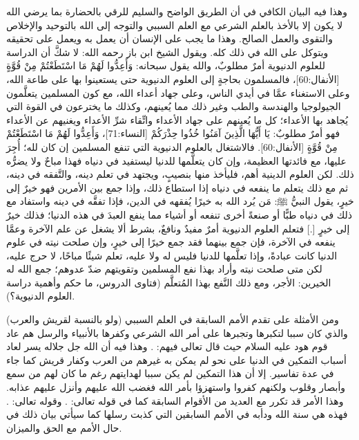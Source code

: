 وهذا فيه البيان الكافي في أن الطريق الواضح والسليم للرقي بالحضارة بما يرضي الله لا يكون إلا بالأخذ بالعلم الشرعي مع العلم السببي والتوجه إلى الله بالتوحيد والإخلاص والتقوى والعمل الصالح. وهذا ما يجب على الإنسان أن يعمل به ويعمل على تحقيقه ويتوكل على الله في ذلك كله. ويقول الشيخ ابن باز رحمه الله: لا شكَّ أن الدراسة للعلوم الدنيوية أمرٌ مطلوبٌ، والله يقول سبحانه: وَأَعِدُّوا لَهُمْ مَا اسْتَطَعْتُمْ مِنْ قُوَّةٍ [الأنفال:60]، فالمسلمون بحاجةٍ إلى العلوم الدنيوية حتى يستعينوا بها على طاعة الله، وعلى الاستغناء عمَّا في أيدي الناس، وعلى جهاد أعداء الله، مع كون المسلمين يتعلَّمون الجيولوجيا والهندسة والطب وغير ذلك مما يُعينهم، وكذلك ما يخترعون في القوة التي يُجاهد بها الأعداء؛ كل ما يُعينهم على جهاد الأعداء واتِّقاء شرِّ الأعداء ويغنيهم عن الأعداء فهو أمرٌ مطلوبٌ: يَا أَيُّهَا الَّذِينَ آمَنُوا خُذُوا حِذْرَكُمْ [النساء:71]، وَأَعِدُّوا لَهُمْ مَا اسْتَطَعْتُمْ مِنْ قُوَّةٍ [الأنفال:60]. فالاشتغال بالعلوم الدنيوية التي تنفع المسلمين إن كان لله؛ أُجِرَ عليها، مع فائدتها العظيمة، وإن كان يتعلَّمها للدنيا ليستفيد في دنياه فهذا مباحٌ ولا يضرُّه ذلك.
لكن العلوم الدينية أهم، فليأخذ منها بنصيبٍ، ويجتهد في تعلم دينه، والتَّفقه في دينه، ثم مع ذلك يتعلم ما ينفعه في دنياه إذا استطاع ذلك، وإذا جمع بين الأمرين فهو خيرٌ إلى خيرٍ، يقول النبيُّ ﷺ: مَن يُرد الله به خيرًا يُفقهه في الدين، فإذا تفقَّه في دينه واستفاد مع ذلك في دنياه طبًّا أو صنعةً أخرى تنفعه أو أشياء مما ينفع العبدَ في هذه الدنيا؛ فذلك خيرٌ إلى خيرٍ [.] فتعلم العلوم الدنيوية أمرٌ مفيدٌ ونافعٌ، بشرط ألا يشغل عن علم الآخرة وعمَّا ينفعه في الآخرة، فإن جمع بينهما فقد جمع خيرًا إلى خيرٍ، وإن صلحت نيته في علوم الدنيا كانت عبادةً، وإذا تعلَّمها للدنيا فليس له ولا عليه، تعلم شيئًا مباحًا، لا حرج عليه، لكن متى صلحت نيته وأراد بهذا نفع المسلمين وتقويتهم ضدّ عدوهم؛ جمع الله له الخيرين: الأجر، ومع ذلك النَّفع بهذا المُتعلَّم {\footnotesize (فتاوى الدروس، ما حكم وأهمية دراسة العلوم الدنيوية؟)}.


ومن الأمثلة على تقدم الأمم السابقة في العلم السببي (ولو بالنسبة لقريش والعرب) والذي كان سببا لتكبرها وتجبرها على أمر الله الشرعي وكفرها بالأنبياء والرسل هم عاد قوم هود عليه السلام حيث قال تعالى فيهم:
\quranayah*[46][26]{\footnotesize \surahname*[46]}. وهذا فيه أن الله جل جلاله يسر لعاد أسباب التمكين في الدنيا على نحو لم يمكن به غيرهم من العرب وكفار قريش كما جاء في عدة تفاسير. إلا أن هذا التمكين لم يكن سببا لهدايتهم رغم ما كان لهم من سمع وأبصار وقلوب ولكنهم كفروا واستهزؤا بأمر الله فغضب الله عليهم وأنزل عليهم عذابه. وهذا الأمر قد تكرر مع العديد من الأقوام السابقة كما في قوله تعالى: \quranayah*[6][6]{\footnotesize \surahname*[6]}. وقوله تعالى: \quranayah*[30][9]{\footnotesize \surahname*[30]}. فهذه هي سنة الله ودأبه في الأمم السابقين التي كذبت رسلها كما سيأتي بيان ذلك في حال الأمم مع الحق والميزان.

